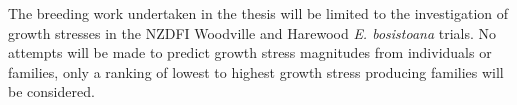 The breeding work undertaken in the thesis will be limited to the investigation
of growth stresses in the NZDFI Woodville and Harewood \textit{E. bosistoana}
trials. No attempts will be made to predict growth stress magnitudes from
individuals or families, only a ranking of lowest to highest growth stress
producing families will be considered.
